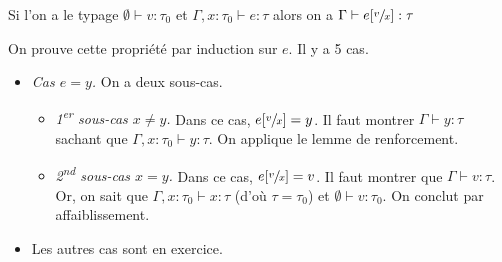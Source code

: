 \documentclass[../main]{subfiles}
\begin{document}
  \begin{lem}
    Si l'on a le typage $\emptyset \vdash v : \tau_0$ et $\Gamma, x : \tau_0 \vdash e : \tau$
    alors on a $\Gamma \vdash e[\sfrac{v}{x}] : \tau$
  \end{lem}
  \begin{prv}
    On prouve cette propriété par induction sur $e$. Il y a 5 cas.
    \begin{itemize}
      \item \textsl{Cas $e = y$.} On a deux sous-cas.
        \begin{itemize}
          \item \textit{1\textsuperscript{er} sous-cas $x \neq y$.}
            Dans ce cas, $e[\sfrac{v}{x}] = y$. Il faut montrer $\Gamma \vdash y : \tau$ sachant que $\Gamma, x : \tau_0 \vdash y : \tau$. On applique le lemme de renforcement.
          \item \textit{2\textsuperscript{nd} sous-cas $x = y$.}
            Dans ce cas, $e[\sfrac{v}{x}] = v$. Il faut montrer que $\Gamma \vdash v : \tau$.
            Or, on sait que $\Gamma, x : \tau_0 \vdash  x : \tau$ (d'où $\tau = \tau_0$) et $\emptyset \vdash v : \tau_0$.
            On conclut par affaiblissement.
        \end{itemize}
      \item Les autres cas sont en exercice.
    \end{itemize}
  \end{prv}
\end{document}
